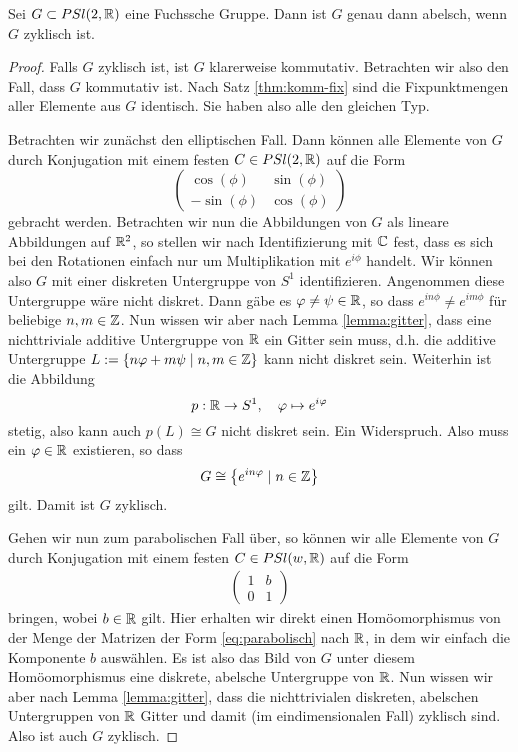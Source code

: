 \begin{thm}
  \label{thm:abelsch-zyklisch}
  Sei $G \subset PSl(2, \mathbb{R})$ eine Fuchssche Gruppe. Dann ist $G$ genau
  dann abelsch, wenn $G$ zyklisch ist.
\end{thm}

\begin{proof}
  Falls $G$ zyklisch ist, ist $G$ klarerweise kommutativ. Betrachten
  wir also den Fall, dass $G$ kommutativ ist. Nach Satz
  \ref{thm:komm-fix} sind die Fixpunktmengen aller Elemente aus $G$
  identisch. Sie haben also alle den gleichen Typ.

  Betrachten wir zunächst den elliptischen Fall. Dann können alle
  Elemente von $G$ durch Konjugation mit einem festen $C \in PSl(2,\mathbb{R})$ auf
  die Form
  \[
  \begin{pmatrix}
    \cos(\phi) & \sin(\phi) \\
    -\sin(\phi) & \cos(\phi)
  \end{pmatrix}
  \]
  gebracht werden. Betrachten wir nun die Abbildungen von $G$ als
  lineare Abbildungen auf $\mathbb{R}^2$, so stellen wir nach Identifizierung
  mit $\mathbb{C}$ fest, dass es sich bei den Rotationen einfach nur um
  Multiplikation mit $e^{i\phi}$ handelt. Wir können also $G$ mit
  einer diskreten Untergruppe von $S^1$ identifizieren. Angenommen
  diese Untergruppe wäre nicht diskret. Dann gäbe es $\varphi \neq \psi
  \in \mathbb{R}$, so dass $e^{in\phi} \neq e^{im\phi}$ für beliebige $n, m
  \in \mathbb{Z}$. Nun wissen wir aber nach Lemma \ref{lemma:gitter}, dass
  eine nichttriviale additive Untergruppe von $\mathbb{R}$ ein Gitter sein
  muss, d.h. die additive Untergruppe $L := \{ n \varphi + m \psi \mid n,m \in
  \mathbb{Z}\}$ kann nicht diskret sein. Weiterhin ist die Abbildung
  \[
  p: \mathbb{R} \rightarrow S^1, \quad \varphi \mapsto e^{i\varphi}
  \]
  stetig, also kann auch $p(L) \cong G$ nicht diskret sein. Ein
  Widerspruch. Also muss ein $\varphi \in \mathbb{R}$ existieren, so dass
  \[
  G \cong \left \{ e^{in\varphi} \mid n \in \mathbb{Z} \right \}
  \]
  gilt. Damit ist $G$ zyklisch.

  Gehen wir nun zum parabolischen Fall über, so können wir alle
  Elemente von $G$ durch Konjugation mit einem festen $C \in PSl(w,
  \mathbb{R})$ auf die Form
  \begin{align}
    \label{eq:parabolisch}
  \begin{pmatrix}
    1 & b\\
    0 & 1
  \end{pmatrix}
  \end{align}
  bringen, wobei $b \in \mathbb{R}$ gilt. Hier erhalten wir direkt einen
  Homöomorphismus von der Menge der Matrizen der Form
  \eqref{eq:parabolisch} nach $\mathbb{R}$, in dem wir einfach die Komponente
  $b$ auswählen. Es ist also das Bild von $G$ unter diesem
  Homöomorphismus eine diskrete, abelsche
  Untergruppe von $\mathbb{R}$. Nun wissen wir aber nach Lemma \ref{lemma:gitter},
  dass die nichttrivialen diskreten, abelschen Untergruppen von $\mathbb{R}$ Gitter und
  damit (im eindimensionalen Fall) zyklisch sind. Also ist auch $G$
  zyklisch.


\end{proof}

